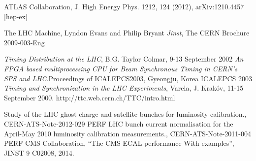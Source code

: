 \begin{thebibliography}{9}
ATLAS Collaboration, J. High Energy Phys. 1212, 124
(2012), arXiv:1210.4457 [hep-ex]

 The LHC Machine, Lyndon Evans and Philip Bryant \textit{Jinst},
 The CERN Brochure 2009-003-Eng

 \textit{Timing Distribution at the LHC},  B.G. Taylor Colmar, 9-13 September 2002
 \textit{An FPGA based multiprocessing CPU for Beam
Synchronous Timing in CERN’s SPS and LHC}.Proceedings of ICALEPCS2003, Gyeongju, Korea
ICALEPCS 2003
 \textit{Timing and Synchronization in the LHC Experiments}, Varela, J. Krakóv, 11-15 September 2000.
 http://ttc.web.cern.ch/TTC/intro.html

 Study of the LHC ghost charge and
satellite bunches for luminosity calibration., CERN-ATS-Note-2012-029 PERF
 LHC bunch current normalisation for the April-May 2010 luminosity calibration measurements., CERN-ATS-Note-2011-004 PERF
CMS Collaboration, ``The CMS ECAL performance With examples'', JINST 9 C02008, 2014.





\end{thebibliography}
